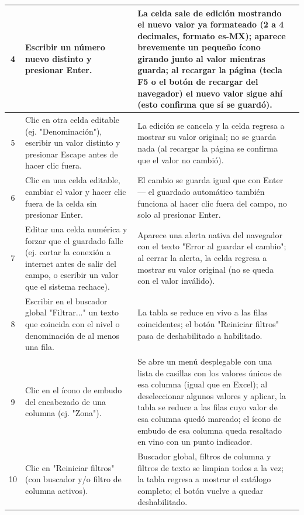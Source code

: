 \documentclass[11pt]{article}
\newcommand{\chk}[1]{\CheckBox[name=#1,width=11pt,height=11pt,bordercolor=grisborde,backgroundcolor=1 1 1]{}}
\begin{document}
\begin{Form}
\begin{longtable}{|c|p{6.7cm}|p{6.7cm}|c|}
4 &
Escribir un número nuevo distinto y presionar Enter. &
La celda sale de edición mostrando el nuevo valor ya formateado (2 a 4 decimales, formato es-MX);
aparece brevemente un pequeño ícono girando junto al valor mientras guarda; al recargar la página
(tecla F5 o el botón de recargar del navegador) el nuevo valor sigue ahí (esto confirma que sí se
guardó). &
\chk{t2r4} \\ \hline

5 &
Clic en otra celda editable (ej. "Denominación"), escribir un valor distinto y presionar Escape
antes de hacer clic fuera. &
La edición se cancela y la celda regresa a mostrar su valor original; no se guarda nada (al
recargar la página se confirma que el valor no cambió). &
\chk{t2r5} \\ \hline

6 &
Clic en una celda editable, cambiar el valor y hacer clic fuera de la celda sin presionar Enter. &
El cambio se guarda igual que con Enter --- el guardado automático también funciona al hacer clic
fuera del campo, no solo al presionar Enter. &
\chk{t2r6} \\ \hline

7 &
Editar una celda numérica y forzar que el guardado falle (ej. cortar la conexión a internet antes
de salir del campo, o escribir un valor que el sistema rechace). &
Aparece una alerta nativa del navegador con el texto "Error al guardar el cambio"; al cerrar la
alerta, la celda regresa a mostrar su valor original (no se queda con el valor inválido). &
\chk{t2r7} \\ \hline

8 &
Escribir en el buscador global "Filtrar..." un texto que coincida con el nivel o denominación de
al menos una fila. &
La tabla se reduce en vivo a las filas coincidentes; el botón "Reiniciar filtros" pasa de
deshabilitado a habilitado. &
\chk{t2r8} \\ \hline

9 &
Clic en el ícono de embudo del encabezado de una columna (ej. "Zona"). &
Se abre un menú desplegable con una lista de casillas con los valores únicos de esa columna
(igual que en Excel); al deseleccionar
algunos valores y aplicar, la tabla se reduce a las filas cuyo valor de esa columna quedó marcado;
el ícono de embudo de esa columna queda resaltado en vino con un punto indicador. &
\chk{t2r9} \\ \hline

10 &
Clic en "Reiniciar filtros" (con buscador y/o filtro de columna activos). &
Buscador global, filtros de columna y filtros de texto se limpian todos a la vez; la tabla regresa
a mostrar el catálogo completo; el botón vuelve a quedar deshabilitado. &
\chk{t2r10} \\ \hline


\end{longtable}
\end{Form}
\end{document}
